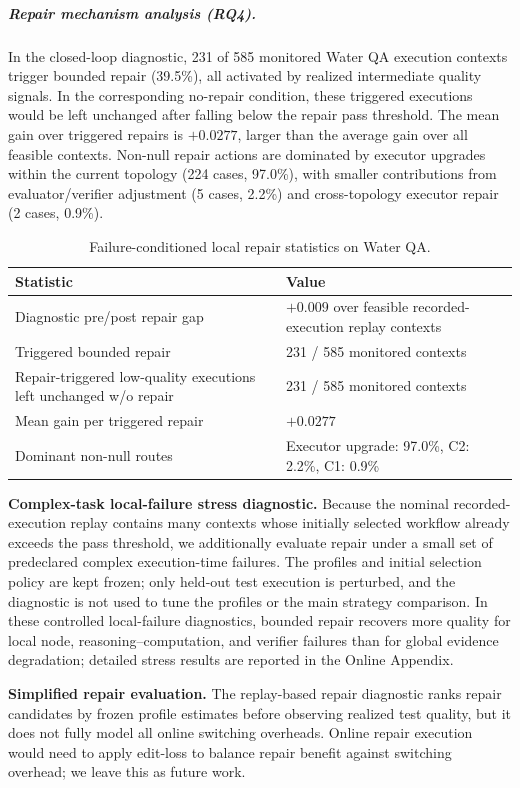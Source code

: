\documentclass[acmsmall,review,anonymous]{acmart}
\begin{document}
\subparagraph{Repair mechanism analysis (RQ4).}
In the closed-loop diagnostic, 231 of 585 monitored Water QA execution contexts trigger bounded repair (39.5\%), all activated by realized intermediate quality signals. In the corresponding no-repair condition, these triggered executions would be left unchanged after falling below the repair pass threshold. The mean gain over triggered repairs is $+0.0277$, larger than the average gain over all feasible contexts. Non-null repair actions are dominated by executor upgrades within the current topology (224 cases, 97.0\%), with smaller contributions from evaluator/verifier adjustment (5 cases, 2.2\%) and cross-topology executor repair (2 cases, 0.9\%).
\begin{table}[t]
\centering
\caption{Failure-conditioned local repair statistics on Water QA.}
\label{tab:repair_stats}
\small
\begin{tabular}{ll}
\toprule
\textbf{Statistic} & \textbf{Value} \\
\midrule
Diagnostic pre/post repair gap & $+0.009$ over feasible recorded-execution replay contexts \\
Triggered bounded repair & 231 / 585 monitored contexts \\
Repair-triggered low-quality executions left unchanged w/o repair & 231 / 585 monitored contexts \\
Mean gain per triggered repair & $+0.0277$ \\
Dominant non-null routes & Executor upgrade: 97.0\%, C2: 2.2\%, C1: 0.9\% \\
\bottomrule
\end{tabular}
\end{table}

\textbf{Complex-task local-failure stress diagnostic.}
Because the nominal recorded-execution replay contains many contexts whose initially selected workflow already exceeds the pass threshold, we additionally evaluate repair under a small set of predeclared complex execution-time failures. The profiles and initial selection policy are kept frozen; only held-out test execution is perturbed, and the diagnostic is not used to tune the profiles or the main strategy comparison. In these controlled local-failure diagnostics, bounded repair recovers more quality for local node, reasoning--computation, and verifier failures than for global evidence degradation; detailed stress results are reported in the Online Appendix.

\textbf{Simplified repair evaluation.} The replay-based repair diagnostic ranks repair candidates by frozen profile estimates before observing realized test quality, but it does not fully model all online switching overheads. Online repair execution would need to apply edit-loss to balance repair benefit against switching overhead; we leave this as future work.
\end{document}
